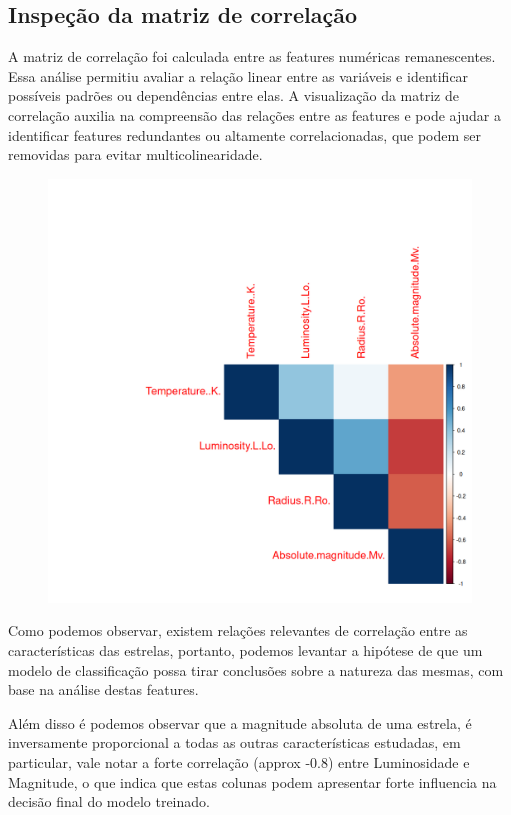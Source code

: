 \documentclass[11pt]{article}
\theoremstyle{definition}
\begin{document}
\subsection{Inspeção da matriz de correlação}
A matriz de correlação foi calculada entre as features numéricas remanescentes. Essa análise permitiu avaliar a relação linear entre as variáveis e identificar possíveis padrões ou dependências entre elas. A visualização da matriz de correlação auxilia na compreensão das relações entre as features e pode ajudar a identificar features redundantes ou altamente correlacionadas, que podem ser removidas para evitar multicolinearidade.
\begin{figure}[htbp]
    \begin{center}
        \includegraphics[scale=0.5]{../correlation_matrix.png}
    \end{center}
\end{figure}

Como podemos observar, existem relações relevantes de correlação entre as características das estrelas,
portanto, podemos levantar a hipótese de que um modelo de classificação possa tirar conclusões sobre a natureza das mesmas, com base na análise destas features.

Além disso é podemos observar que a magnitude absoluta de uma estrela, é inversamente proporcional a todas as outras
características estudadas, em particular, vale notar a forte correlação (approx -0.8) entre Luminosidade e Magnitude, o
que indica que estas colunas podem apresentar forte influencia na decisão final do modelo treinado.
\end{document}
